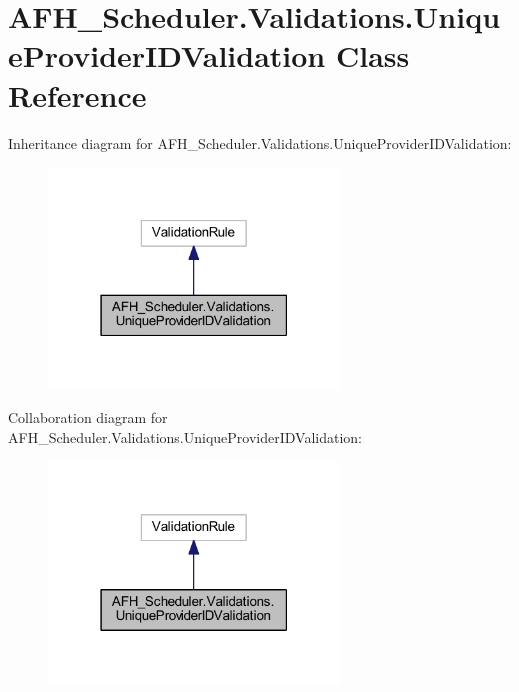 \section{A\+F\+H\+\_\+\+Scheduler.\+Validations.\+Unique\+Provider\+I\+D\+Validation Class Reference}
\label{class_a_f_h___scheduler_1_1_validations_1_1_unique_provider_i_d_validation}


Inheritance diagram for A\+F\+H\+\_\+\+Scheduler.\+Validations.\+Unique\+Provider\+I\+D\+Validation\+:
\nopagebreak
\begin{figure}[H]
\begin{center}
\leavevmode
\includegraphics[width=219pt]{class_a_f_h___scheduler_1_1_validations_1_1_unique_provider_i_d_validation__inherit__graph}
\end{center}
\end{figure}


Collaboration diagram for A\+F\+H\+\_\+\+Scheduler.\+Validations.\+Unique\+Provider\+I\+D\+Validation\+:
\nopagebreak
\begin{figure}[H]
\begin{center}
\leavevmode
\includegraphics[width=219pt]{class_a_f_h___scheduler_1_1_validations_1_1_unique_provider_i_d_validation__coll__graph}
\end{center}
\end{figure}
